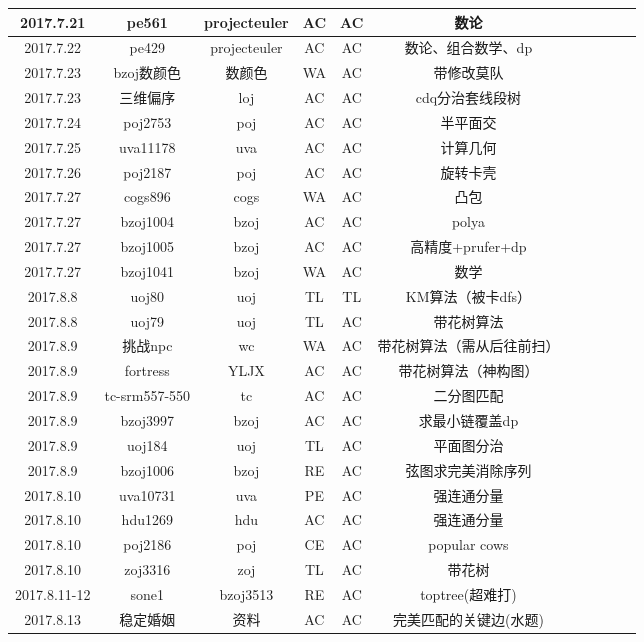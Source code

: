 \documentclass[landscape]{article}
\begin{document}
\begin{longtable}{ccccccccccc}
  \hline
  2017.7.21 & pe561 & projecteuler & AC & AC & 数论\\
  \hline
  2017.7.22 & pe429 & projecteuler & AC & AC & 数论、组合数学、dp\\
  \hline
  2017.7.23 & bzoj数颜色 & 数颜色 & WA & AC & 带修改莫队\\
  \hline
  2017.7.23 & 三维偏序 & loj & AC & AC & cdq分治套线段树\\
  \hline
  2017.7.24 & poj2753 & poj & AC & AC & 半平面交\\
  \hline
  2017.7.25 & uva11178 & uva & AC & AC & 计算几何\\
  \hline
  2017.7.26 & poj2187 & poj & AC & AC & 旋转卡壳\\
  \hline
  2017.7.27 & cogs896 & cogs & WA & AC & 凸包\\
  \hline
  2017.7.27 & bzoj1004 & bzoj & AC & AC & polya\\
  \hline
  2017.7.27 & bzoj1005 & bzoj & AC & AC & 高精度+prufer+dp\\
  \hline
  2017.7.27 & bzoj1041 & bzoj & WA & AC & 数学\\
  \hline
  2017.8.8 & uoj80 & uoj & TL & TL & KM算法（被卡dfs）\\
  \hline
  2017.8.8 & uoj79 & uoj & TL & AC & 带花树算法\\
  \hline
  2017.8.9 & 挑战npc & wc & WA & AC & 带花树算法（需从后往前扫）\\
  \hline
  2017.8.9 & fortress & YLJX & AC & AC & 带花树算法（神构图）\\
  \hline
  2017.8.9 & tc-srm557-550 & tc & AC & AC & 二分图匹配\\
  \hline
  2017.8.9 & bzoj3997 & bzoj & AC & AC & 求最小链覆盖dp\\
  \hline
  2017.8.9 & uoj184 & uoj & TL & AC & 平面图分治\\
  \hline
  2017.8.9 & bzoj1006 & bzoj & RE & AC & 弦图求完美消除序列\\
  \hline
  2017.8.10 & uva10731 & uva & PE & AC & 强连通分量\\
  \hline
  2017.8.10 & hdu1269 & hdu & AC & AC & 强连通分量\\
  \hline
  2017.8.10 & poj2186 & poj & CE & AC & popular cows\\
  \hline
  2017.8.10 & zoj3316 & zoj & TL & AC & 带花树\\
  \hline
  2017.8.11-12 & sone1 & bzoj3513 & RE & AC & toptree(超难打)\\
  \hline
  2017.8.13 & 稳定婚姻 & 资料 & AC & AC & 完美匹配的关键边(水题)\\

\end{longtable}
\end{document}
